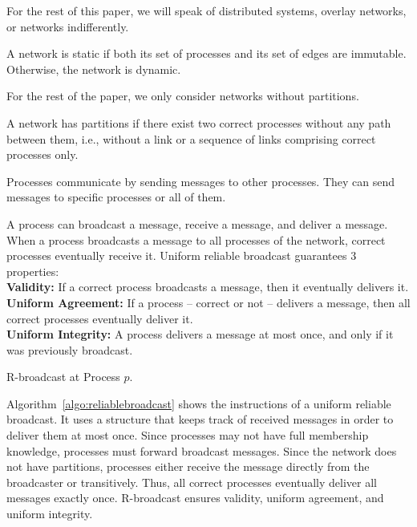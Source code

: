 For the rest of this paper, we will speak of distributed systems, overlay
networks, or networks indifferently.

\begin{definition}
  A network is static if both its set of processes and its set of edges are
  immutable. Otherwise, the network is dynamic.
\end{definition}

For the rest of the paper, we only consider networks without partitions.

\begin{definition}
  A network has partitions if there exist two correct processes without any path
  between them, i.e., without a link or a sequence of links comprising correct
  processes only.
\end{definition}


Processes communicate by sending messages to other processes. They can send
messages to specific processes or all of them.

\begin{definition}
  A process can broadcast a message, receive a message, and deliver a message.
  When a process broadcasts a message to all processes of the network, correct
  processes eventually receive it. 
  Uniform reliable broadcast guarantees 3 properties: \\
  \textbf{Validity:} If a correct process broadcasts a message, then it
  eventually delivers it. \\
  \textbf{Uniform Agreement:} If a process -- correct or not -- delivers a
  message, then all correct processes eventually deliver it. \\
  \textbf{Uniform Integrity:} A process delivers a message at most once, and
  only if it was previously broadcast.
\end{definition}

\begin{algorithm}[h]
  
  \caption{\label{algo:reliablebroadcast}R-broadcast at Process $p$.}
\end{algorithm}

Algorithm~\ref{algo:reliablebroadcast} shows the instructions of a uniform
reliable broadcast. It uses a structure that keeps track of received messages in
order to deliver them at most once. 
Since processes may not have full membership knowledge, processes must forward
broadcast messages. Since the network does not have partitions, processes either
receive the message directly from the broadcaster or transitively. Thus, all
correct processes eventually deliver all messages exactly once. R-broadcast
ensures validity, uniform agreement, and uniform integrity.

